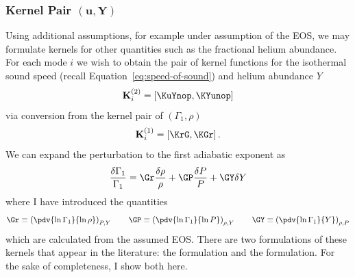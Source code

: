 \subsubsection*{Kernel Pair $\mathbf{(u,Y)}$}
\noindent
Using additional assumptions, for example under assumption of the EOS, we may formulate kernels for other quantities such as the fractional helium abundance. 
For each mode $i$ we wish to obtain the pair of kernel functions for the isothermal sound speed (recall Equation~\ref{eq:speed-of-sound}) and helium abundance $Y$
\begin{equation}
    \mathbf K^{(2)}_i = \left[ \KuYnop, \KYunop \right]
\end{equation}
via conversion from the kernel pair of ${(\Gamma_1, \rho)}$
\begin{equation}
    \mathbf K^{(1)}_i = \left[ \KrG, \KGr \right].
\end{equation}
We can expand the perturbation to the first adiabatic exponent as
\begin{equation}
    \frac{\delta \Gamma_1}{\Gamma_1}
    =
    \Gr \frac{\delta\rho}{\rho}
    +
    \GP \frac{\delta P}{P}
    +
    \GY \delta Y
\end{equation}
where I have introduced the quantities
\begin{equation}
    \Gr \equiv \left( \pdv{\ln \Gamma_1}{\ln \rho} \right)_{P, Y} \qquad 
    \GP \equiv \left( \pdv{\ln \Gamma_1}{\ln P} \right)_{\rho, Y} \qquad
    \GY \equiv \left( \pdv{\ln \Gamma_1}{Y} \right)_{\rho, P}
\end{equation} 
which are calculated from the assumed EOS. 
There are two formulations of these kernels that appear in the literature: the \citet{ThompsonJCD2002} formulation and the \citet{Kosovichev1999} formulation. 
For the sake of completeness, I show both here. 

